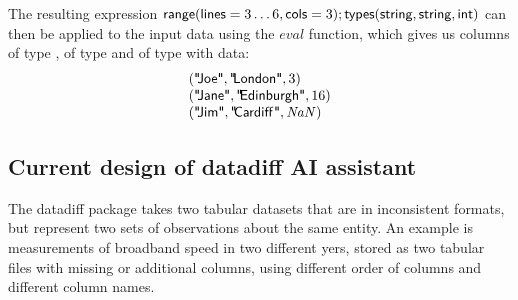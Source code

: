 \documentclass{article}
\begin{document}
The resulting expression 
$\textnormal{\sffamily range}(\textnormal{\sffamily lines}=3\ldots 6, \textnormal{\sffamily cols}=3); \textnormal{\sffamily types}(\textnormal{\sffamily string},\textnormal{\sffamily string},\textnormal{\sffamily int})$
can then be applied to the input data using the $\mathit{eval}$ function, which gives us 
columns  of type ,  of type 
and  of type  with data:
%
\begin{equation*}
\begin{array}{l}
(\textnormal{\sffamily "\hspace{-0.2em}Joe"}, \textnormal{\sffamily "\hspace{-0.2em}London"}, 3)\\
(\textnormal{\sffamily "\hspace{-0.2em}Jane"}, \textnormal{\sffamily "\hspace{-0.2em}Edinburgh"}, 16)\\
(\textnormal{\sffamily "\hspace{-0.2em}Jim"}, \textnormal{\sffamily "\hspace{-0.2em}Cardiff\hspace{0.1em}"}, \mathit{NaN})
\end{array}
\end{equation*}

\subsection{Current design of datadiff AI assistant}

The datadiff package takes two tabular datasets that are in inconsistent formats, but represent
two sets of observations about the same entity. An example is measurements of broadband speed in
two different yers, stored as two tabular files with missing or additional columns, using different
order of columns and different column names.
\end{document}

